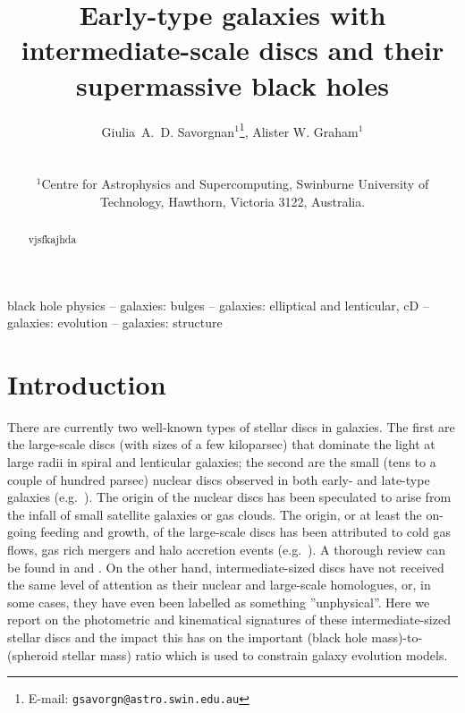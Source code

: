 \documentclass[useAMS,usenatbib,article]{mn2e}
\title[Intermediate-scale discs]{Early-type galaxies with intermediate-scale discs and their supermassive black holes}
\author[G.~A.~D. Savorgnan \& A.~W. Graham]
{\parbox{\textwidth}{
Giulia~A.~D. Savorgnan$^{1}$\thanks{E-mail: \texttt{gsavorgn@astro.swin.edu.au}},
Alister W. Graham$^{1}$}\vspace{0.4cm}\\
\parbox{\textwidth}{
$^{1}$Centre for Astrophysics and Supercomputing, Swinburne University of Technology, Hawthorn, Victoria 3122, Australia.\\}}
\begin{document}
\maketitle

\label{firstpage}



\begin{abstract}
vjsfkajhda
\end{abstract}

\begin{keywords}
black hole physics -- galaxies: bulges -- galaxies: elliptical and lenticular, cD -- galaxies: evolution -- galaxies: structure
\end{keywords}

\section{Introduction}
\label{sec:int}
There are currently two well-known types of stellar discs in galaxies. 
The first are the large-scale discs (with sizes of a few kiloparsec) 
that dominate the light at large radii in spiral and lenticular galaxies; 
the second are the small (tens to a couple of hundred parsec) nuclear discs observed in both early- and late-type galaxies 
(e.g.~\citealt{scorzavandenbosch1998,rest2001,balcells2007,ledo2010}). 
The origin of the nuclear discs has been speculated to arise from the infall of small satellite galaxies or gas clouds.  
The origin, or at least the on-going feeding and growth, of the large-scale discs has been attributed to cold gas flows, 
gas rich mergers and halo accretion events 
(e.g.~\citealt{khochfarsilk2006,dekel2009nat,ceverino2010,ceverino2012,conselice2012}). 
A thorough review can be found in \citet{combes2014arX} and \citet{combes2014pro}.
On the other hand, intermediate-sized discs have not received the same level of attention 
as their nuclear and large-scale homologues, 
or, in some cases, they have even been labelled as something ''unphysical''. 
Here we report on the photometric and kinematical signatures of these intermediate-sized stellar discs 
and the impact this has on the important (black hole mass)-to-(spheroid stellar mass) ratio %
which is used to constrain galaxy evolution models. \\
\end{document}

